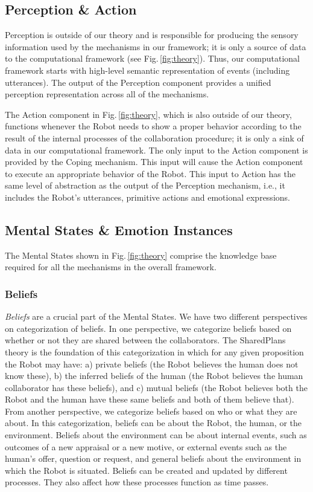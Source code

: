 \subsection{Perception \& Action}
\label{sec:tom-mech}

Perception is outside of our theory and is responsible for producing the sensory
information used by the mechanisms in our framework; it is only a source of data
to the computational framework (see Fig.\,\ref{fig:theory}). Thus, our
computational framework starts with high-level semantic representation of events
(including utterances). The output of the Perception component provides a
unified perception representation across all of the mechanisms.

The Action component in Fig.\,\ref{fig:theory}, which is also outside of our
theory, functions whenever the Robot needs to show a proper behavior according
to the result of the internal processes of the collaboration procedure; it is
only a sink of data in our computational framework. The only input to the Action
component is provided by the Coping mechanism. This input will cause the Action
component to execute an appropriate behavior of the Robot. This input to Action
has the same level of abstraction as the output of the Perception mechanism,
i.e., it includes the Robot's utterances, primitive actions and emotional
expressions.

\subsection{Mental States \& Emotion Instances}

The Mental States shown in Fig.\,\ref{fig:theory} comprise the knowledge base
required for all the mechanisms in the overall framework.

\subsubsection{Beliefs}
\label{sec:beliefs}

\textit{Beliefs} are a crucial part of the Mental States. We have two different
perspectives on categorization of beliefs. In one perspective, we categorize
beliefs based on whether or not they are shared between the collaborators. The
SharedPlans \cite{grosz:plans-discourse} theory is the foundation of this
categorization in which for any given proposition the Robot may have: a) private
beliefs (the Robot believes the human does not know these), b) the inferred
beliefs of the human (the Robot believes the human collaborator has these
beliefs), and c) mutual beliefs (the Robot believes both the Robot and the human
have these same beliefs and both of them believe that). From another
perspective, we categorize beliefs based on who or what they are about. In this
categorization, beliefs can be about the Robot, the human, or the environment.
Beliefs about the environment can be about internal events, such as outcomes of
a new appraisal or a new motive, or external events such as the human's offer,
question or request, and general beliefs about the environment in which the
Robot is situated. Beliefs can be created and updated by different processes.
They also affect how these processes function as time passes.

